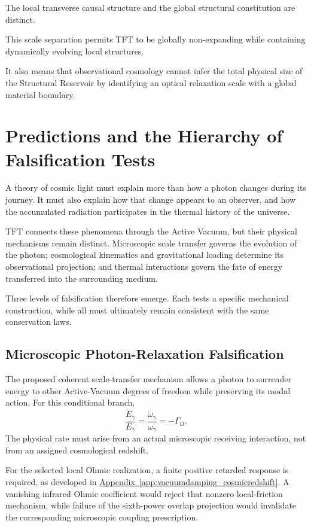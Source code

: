 The local transverse causal structure and the global structural constitution
are distinct.

This scale separation permits TFT to be globally non-expanding while
containing dynamically evolving local structures.

It also means that observational cosmology cannot infer the total physical
size of the Structural Reservoir by identifying an optical relaxation scale
with a global material boundary.


\section{Predictions and the Hierarchy of Falsification Tests}
\label{sec:AU_test_hierarchy}

A theory of cosmic light must explain more than how a photon
changes during its journey. It must also explain how that
change appears to an observer, and how the accumulated
radiation participates in the thermal history of the universe.

TFT connects these phenomena through the Active Vacuum,
but their physical mechanisms remain distinct. Microscopic
scale transfer governs the evolution of the photon;
cosmological kinematics and gravitational loading determine
its observational projection; and thermal interactions
govern the fate of energy transferred into the surrounding
medium.

Three levels of falsification therefore emerge. Each tests
a specific mechanical construction, while all must
ultimately remain consistent with the same conservation laws.

\subsection{Microscopic Photon-Relaxation Falsification}

The proposed coherent scale-transfer mechanism allows a
photon to surrender energy to other Active-Vacuum degrees
of freedom while preserving its modal action. For this
conditional branch,
%
\[
\frac{\dot E_\gamma}{E_\gamma}
=
\frac{\dot\omega_\gamma}{\omega_\gamma}
=
-\Gamma_{\mathrm D}.
\]
%
The physical rate must arise from an actual microscopic
receiving interaction, not from an assigned cosmological
redshift.

For the selected local Ohmic realization, a finite positive
retarded response is required, as developed in
\hyperref[app:vacuumdamping_cosmicredshift]{Appendix~\ref*{app:vacuumdamping_cosmicredshift}}.
A vanishing infrared Ohmic coefficient would reject that
nonzero local-friction mechanism, while failure of the
sixth-power overlap projection would invalidate the
corresponding microscopic coupling prescription.

